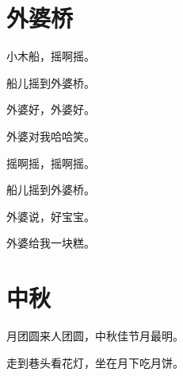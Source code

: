 \documentclass[12pt,UTF-8,openany]{ctexbook}
\begin{document}
\hanzibox{}\hanzibox{}\hanzibox{}\hanzibox{}\hspace{1em}\hanzibox{}\hanzibox{}\hanzibox{}\hanzibox{}

\hanzibox{}\hanzibox{}\hanzibox{}\hanzibox{}\hspace{1em}




\chapter{外婆桥}

\begin{large}
    
    小木船，摇啊摇。
    
    船儿摇到外婆桥。
    
    外婆好，外婆好。
    
    外婆对我哈哈笑。
    
    摇啊摇，摇啊摇。
    
    船儿摇到外婆桥。
    
    外婆说，好宝宝。
    
    外婆给我一块糕。
    
\end{large}


\clearpage

\begin{center}
    
\end{center}


\hanzibox{}\hanzibox{}\hanzibox{}\hanzibox{}\hspace{1em}\hanzibox{}\hanzibox{}\hanzibox{}\hanzibox{}

\hanzibox{}\hanzibox{}\hanzibox{}\hanzibox{}\hspace{1em}\hanzibox{}\hanzibox{}\hanzibox{}\hanzibox{}

\hanzibox{}\hanzibox{}\hanzibox{}\hanzibox{}\hspace{1em}\hanzibox{}\hanzibox{}\hanzibox{}\hanzibox{}






\chapter{中秋}

\begin{large}
    
    月团圆来人团圆，中秋佳节月最明。
    
    走到巷头看花灯，坐在月下吃月饼。
    
\end{large}
\end{document}
